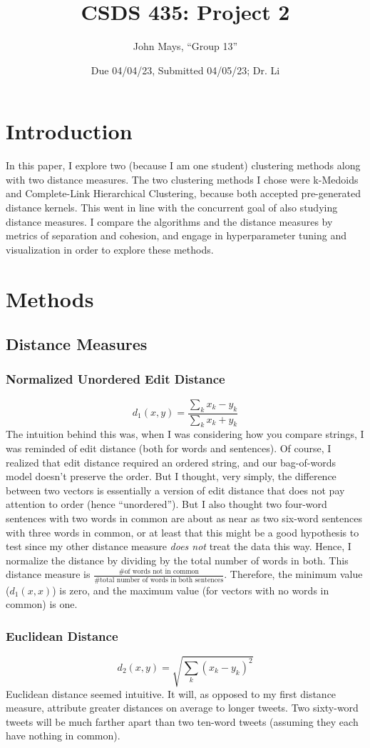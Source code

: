 \documentclass[fleqn]{article}
\title{\textbf{CSDS 435: Project 2}}
\author{John Mays, ``Group 13''}
\date{Due 04/04/23, Submitted 04/05/23; Dr. Li}
\begin{document}
\maketitle
\section{Introduction}
In this paper, I explore two (because I am one student) clustering methods along with two distance measures.  The two clustering methods I chose were k-Medoids and Complete-Link Hierarchical Clustering, because both accepted pre-generated distance kernels.  This went in line with the concurrent goal of also studying distance measures.  I compare the algorithms and the distance measures by metrics of separation and cohesion, and engage in hyperparameter tuning and visualization in order to explore these methods.
\section{Methods}
\subsection{Distance Measures}
\subsubsection{Normalized Unordered Edit Distance}
$$d_{1}(x,y)=\frac{\sum_{k}x_k-y_k}{\sum_{k}x_k+y_k}$$
The intuition behind this was, when I was considering how you compare strings, I was reminded of edit distance (both for words and sentences).  Of course, I realized that edit distance required an ordered string, and our bag-of-words model doesn't preserve the order.  But I thought, very simply, the difference between two vectors is essentially a version of edit distance that does not pay attention to order (hence ``unordered'').  But I also thought two four-word sentences with two words in common are about as near as two six-word sentences with three words in common, or at least that this might be a good hypothesis to test since my other distance measure \textit{does not} treat the data this way.  Hence, I normalize the distance by dividing by the total number of words in both.  This distance measure is $\frac{\text{\# of words not in common}}{\text{\# total number of words in both sentences}}$.  Therefore, the minimum value ($d_{1}(x,x)$) is zero, and the maximum value (for vectors with no words in common) is one.

\subsubsection{Euclidean Distance}
$$d_{2}(x,y)=\sqrt{\sum_{k}(x_k-y_k)^{2}}$$
Euclidean distance seemed intuitive.  It will, as opposed to my first distance measure, attribute greater distances on average to longer tweets.  Two sixty-word tweets will be much farther apart than two ten-word tweets (assuming they each have nothing in common).
\end{document}
